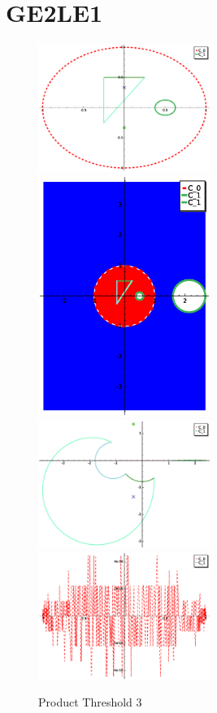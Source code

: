 \documentclass[a4paper,10pt]{article}
\begin{document}
\newpage 
\clearpage
\section{GE2LE1}
\graphicspath{{./GE2LE1PT2/}}
\begin{figure}[!ht]
\caption{Product Threshold 3}
\includegraphics[width=0.5\textwidth]{circle_plot.eps}
\includegraphics[width=0.5\textwidth]{Fundamental_domain.eps}
\includegraphics[width=0.5\textwidth]{zedplot.eps}
\includegraphics[width=0.5\textwidth]{zedplot_C0.eps}
\end{figure}
\end{document}
